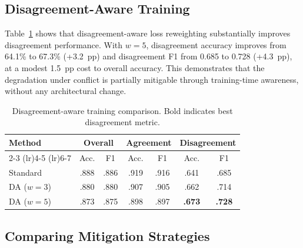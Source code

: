 \documentclass[11pt,a4paper]{article}
\begin{document}
\subsection{Disagreement-Aware Training}

Table~\ref{tab:disagree_aware} shows that disagreement-aware loss reweighting substantially improves disagreement performance.
With $w = 5$, disagreement accuracy improves from 64.1\% to 67.3\% (+3.2~pp) and disagreement F1 from 0.685 to 0.728 (+4.3~pp), at a modest 1.5~pp cost to overall accuracy.
This demonstrates that the degradation under conflict is partially mitigable through training-time awareness, without any architectural change.

\begin{table}[htbp]
\centering
\caption{Disagreement-aware training comparison. Bold indicates best disagreement metric.}
\label{tab:disagree_aware}
\begin{tabular}{lcccccc}
\toprule
\textbf{Method} & \multicolumn{2}{c}{\textbf{Overall}} & \multicolumn{2}{c}{\textbf{Agreement}} & \multicolumn{2}{c}{\textbf{Disagreement}} \\
\cmidrule(lr){2-3} \cmidrule(lr){4-5} \cmidrule(lr){6-7}
 & Acc. & F1 & Acc. & F1 & Acc. & F1 \\
\midrule
Standard           & .888 & .886 & .919 & .916 & .641 & .685 \\
DA ($w = 3$)       & .880 & .880 & .907 & .905 & .662 & .714 \\
DA ($w = 5$)       & .873 & .875 & .898 & .897 & \textbf{.673} & \textbf{.728} \\
\bottomrule
\end{tabular}
\end{table}

\subsection{Comparing Mitigation Strategies}
\end{document}
